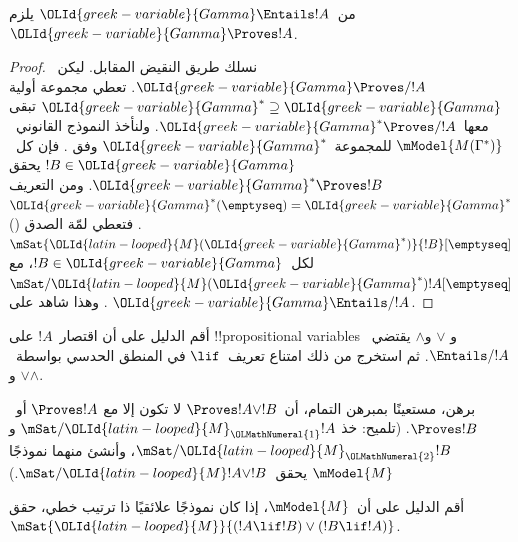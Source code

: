 \documentclass[../../../include/open-logic-section]{subfiles}
\begin{document}


\begin{thm}
  من~${\OLId{greek-variable}{Gamma}} \Entails !A$ يلزم~${\OLId{greek-variable}{Gamma}} \Proves !A$.
\end{thm}

\begin{proof}
  نسلك طريق النقيض المقابل. ليكن~${\OLId{greek-variable}{Gamma}} \Proves/ !A$. تعطي
   مجموعة أولية
  ${\OLId{greek-variable}{Gamma}}^* \supseteq {\OLId{greek-variable}{Gamma}}$ تبقى معها~${\OLId{greek-variable}{Gamma}}^* \Proves/ !A$. ولنأخذ
  النموذج القانوني~$\mModel{M(\Gamma^*)}$ للمجموعة~${\OLId{greek-variable}{Gamma}}^*$ وفق
  . فإن كل~$!B \in {\OLId{greek-variable}{Gamma}}$ يحقق
  ${\OLId{greek-variable}{Gamma}}^* \Proves !B$. ومن التعريف
  ${\OLId{greek-variable}{Gamma}}^*(\emptyseq)={\OLId{greek-variable}{Gamma}}^*$. فتعطي لمّة الصدق
  ()
  $\mSat{{\OLId{latin-looped}{M}}({\OLId{greek-variable}{Gamma}}^*)}{!B}[\emptyseq]$ لكل~$!B \in {\OLId{greek-variable}{Gamma}}$، مع
  $\mSat/{{\OLId{latin-looped}{M}}({\OLId{greek-variable}{Gamma}}^*)}{!A}[\emptyseq]$. وهذا شاهد على
  ${\OLId{greek-variable}{Gamma}} \Entails/ !A$.
\end{proof}

\begin{prob}
  أقم الدليل على أن اقتصار~$!A$ على !!{propositional variable}s و
  $\lor$ و$\land$ يقتضي~$\Entails/ !A$. ثم استخرج من ذلك امتناع تعريف~$\lif$
  في المنطق الحدسي بواسطة~$\lor$ و$\land$.
\end{prob}

\begin{prob}
  برهن، مستعينًا بمبرهن التمام، أن~$\Proves !A \lor !B$ لا تكون إلا مع
  $\Proves !A$ أو~$\Proves !B$. (تلميح: خذ
  $\mSat/{{\OLId{latin-looped}{M}}_{\OLMathNumeral{1}}}{!A}$ و$\mSat/{{\OLId{latin-looped}{M}}_{\OLMathNumeral{2}}}{!B}$، وأنشئ منهما نموذجًا
  $\mModel{M}$ يحقق~$\mSat/{{\OLId{latin-looped}{M}}}{!A \lor !B}$.)
\end{prob}

\begin{prob}
  أقم الدليل على أن~$\mModel{M}$، إذا كان نموذجًا علائقيًا ذا ترتيب خطي،
  حقق~$\mSat{{\OLId{latin-looped}{M}}}{(!A \lif !B)\lor(!B \lif !A)}$.
\end{prob}
\end{document}
